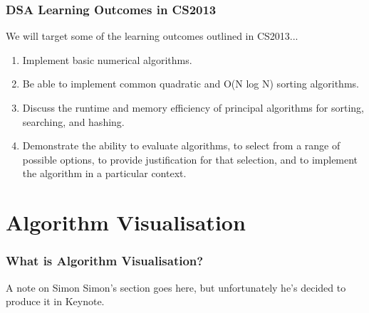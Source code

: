 \documentclass{beamer}
\begin{document}
\begin{frame}
  \frametitle{DSA Learning Outcomes in CS2013}
  We will target some of the learning outcomes outlined in CS2013...
  \begin{enumerate}
    \item Implement basic numerical algorithms.
    \item Be able to implement common quadratic and O(N log N) sorting algorithms.
    \item Discuss the runtime and memory efficiency of principal algorithms for sorting, searching, and hashing.
    \item Demonstrate the ability to evaluate algorithms, to select from a range of possible options, to provide justification for that selection, and to implement the algorithm in a particular context. 
  \end{enumerate}
\end{frame}
\section{Algorithm Visualisation}
\begin{frame}
  \frametitle{What is Algorithm Visualisation?}
  \begin{block}{A note on Simon}
    Simon's section goes here, but unfortunately he's decided to produce it in Keynote.
  \end{block}
\end{frame}
\end{document}
